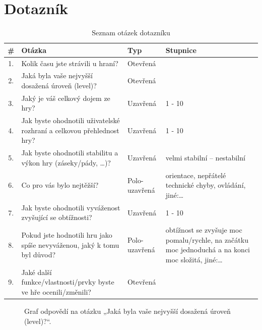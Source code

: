 \section{Dotazník}

\begin{table}[h]
    \centering
    \renewcommand{\arraystretch}{1.3}
    \begin{tabularx}{\textwidth}{c|X|l|X}
    \hline
    \textbf{\#} & \textbf{Otázka} & \textbf{Typ} & \textbf{Stupnice} \\ \hline
    1. & Kolik času jste strávili u hraní? & Otevřená & \\ 
    2. & Jaká byla vaše nejvyšší dosažená úroveň (level)? & Otevřená &  \\ 
    3. & Jaký je váš celkový dojem ze hry? & Uzavřená &  1 - 10 \\ 
    4. & Jak byste ohodnotili uživatelské rozhraní a celkovou přehlednost hry? & Uzavřená & 1 - 10\\ 
    5. & Jak byste ohodnotili stabilitu a výkon hry (záseky/pády, \ldots)? & Uzavřená & velmi stabilní – nestabilní\\ 
    6. & Co pro vás bylo nejtěžší? & Polo-uzavřená & orientace, nepřátelé technické chyby, ovládání, jiné:\ldots \\ 
    7. & Jak byste ohodnotili vyváženost zvyšující se obtížnosti? & Uzavřená &  1 - 10 \\ 
    8. & Pokud jste hodnotili hru jako spíše nevyváženou, jaký k tomu byl důvod? & Polo-uzavřená & obtížnost se zvyšuje moc pomalu/rychle, na začátku moc jednoduchá a na konci moc složitá, jiné:\ldots \\ 
    9. & Jaké další funkce/vlastnosti/prvky byste ve hře ocenili/změnili? & Otevřená & \\
    \hline
    \end{tabularx}
    \caption{Seznam otázek dotazníku}
    \label{tab:questions}
\end{table}

\begin{figure}[ht]
    \centering
    \caption{Graf odpovědí na otázku „Jaká byla vaše nejvyšší dosažená úroveň (level)?“.}
    \label{fig:nejvyssi_uroven}
\end{figure}

